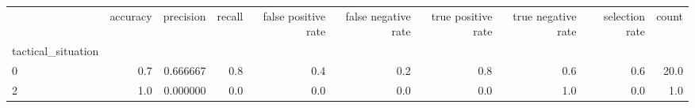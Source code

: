 \begin{tabular}{lrrrrrrrrr}
\toprule
{} &  accuracy &  precision &  recall &  false positive rate &  false negative rate &  true positive rate &  true negative rate &  selection rate &  count \\
tactical\_situation &           &            &         &                      &                      &                     &                     &                 &        \\
\midrule
0                  &       0.7 &   0.666667 &     0.8 &                  0.4 &                  0.2 &                 0.8 &                 0.6 &             0.6 &   20.0 \\
2                  &       1.0 &   0.000000 &     0.0 &                  0.0 &                  0.0 &                 0.0 &                 1.0 &             0.0 &    1.0 \\
\bottomrule
\end{tabular}

